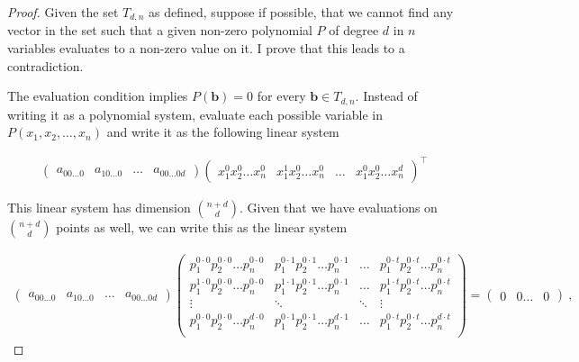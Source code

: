 \question

\newcommand{\bvar}{\mathbf{b}}

\begin{proof}
    Given the set \(T_{d, n}\) as defined, suppose if possible, that we cannot
    find any vector in the set such that a given non-zero polynomial \(P\) of
    degree \(d\) in \(n\) variables evaluates to a non-zero value on it. I prove
    that this leads to a contradiction.

    The evaluation condition implies \(P(\bvar) = 0\) for every \(\bvar \in
    T_{d, n}\). Instead of writing it as a polynomial system, evaluate each
    possible variable in \(P(x_1, x_2, \ldots, x_n)\) and write it as the
    following linear system

    \begin{gather*}
        \begin{pmatrix}
            a_{00\ldots 0} & a_{10\ldots 0} & \ldots & a_{00\ldots 0 d}
        \end{pmatrix}
        \begin{pmatrix}
            x_1^0x_2^0\ldots x_n^0 & x_1^1x_2^0\ldots x_n^0 & \ldots & x_1^0x_2^0\ldots x_n^d
        \end{pmatrix}^\top
    \end{gather*}

    This linear system has dimension \(\binom{n+d}{d}\). Given that we have
    evaluations on \(\binom{n+d}{d}\) points as well, we can write this as the
    linear system

    \begin{gather*}
        \begin{pmatrix}
            a_{00\ldots 0} & a_{10\ldots 0} & \ldots & a_{00\ldots 0 d}
        \end{pmatrix}
        \begin{pmatrix}
            p_1^{0\cdot 0}p_2^{0 \cdot 0}\ldots p_n^{0 \cdot 0} & p_1^{0\cdot 1}p_2^{0 \cdot 1}\ldots p_n^{0 \cdot 1} & \ldots & p_1^{0\cdot t}p_2^{0 \cdot t}\ldots p_n^{0 \cdot t}\\
            p_1^{1\cdot 0}p_2^{0 \cdot 0}\ldots p_n^{0 \cdot 0} & p_1^{1\cdot 1}p_2^{0 \cdot 1}\ldots p_n^{0 \cdot 1} & \ldots & p_1^{1\cdot t}p_2^{0 \cdot t}\ldots p_n^{0 \cdot t}\\
            \vdots & \ddots & \ddots & \vdots\\
            p_1^{0\cdot 0}p_2^{0 \cdot 0}\ldots p_n^{d \cdot 0} & p_1^{0\cdot 1}p_2^{0 \cdot 1}\ldots p_n^{d \cdot 1} & \ldots & p_1^{0\cdot t}p_2^{0 \cdot t}\ldots p_n^{d \cdot t}\\
        \end{pmatrix} = 
        \begin{pmatrix}
            0 & 0 \ldots & 0
        \end{pmatrix}~,
    \end{gather*}


\end{proof}
